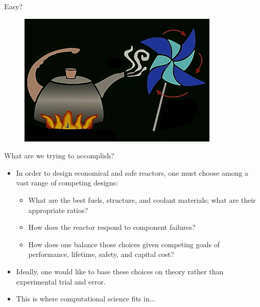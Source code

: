 \documentclass[xcolor=x11names,compress]{beamer}
\renewcommand{\(}{\begin{columns}}
\renewcommand{\)}{\end{columns}}
\newcommand{\<}[1]{\begin{column}{#1}}
\renewcommand{\>}{\end{column}}
\begin{document}
\begin{frame}{Easy?}
 \begin{figure}
   \begin{center}
     \includegraphics[height=2.5in,clip]{TeaPot}
   \end{center}
 \end{figure}
\end{frame}

\begin{frame}{What are we trying to accomplish?}
\begin{itemize}
\item In order to design economical and safe reactors, one must choose among a vast range of competing designs:
\begin{itemize}
\item What are the best fuels, structure, and coolant materials; what are their appropriate ratios?
\item How does the reactor respond to component failures?
\item How does one balance those choices given competing goals of performance, lifetime, safety, and capital cost?
\end{itemize}
\item Ideally, one would like to base these choices on theory rather than experimental trial and error.
\item This is where \textcolor{dgreen}{computational science} fits in...
\end{itemize}
\end{frame}
\end{document}
